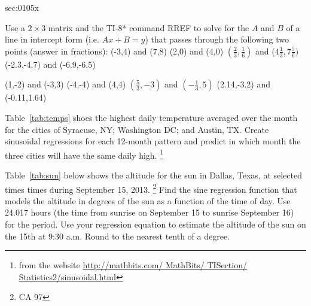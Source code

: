 \begin{multicols*}{2}
\begin{exercises}{sec:0105x}
\prob[0105LM1]
Use a $2 \times 3$ matrix and the TI-8* command RREF to solve for the
$A$ and $B$ of a line in intercept form (i.e. $Ax+B=y$) that passes
through the following two points (answer in fractions):
\subprob (-3,4) and (7,8)
\subprob (2,0) and (4,0)
\subprob $(\frac{2}{3},\frac{1}{6})$ and ($4\frac{1}{3},7\frac{5}{6})$
\subprob (-2.3,-4.7) and (-6.9,-6.5)

\prob[0105LM2]
\subprob (1,-2) and (-3,3)
\subprob (-4,-4) and (4,4)
\subprob $(\frac{5}{3},-3)$ and $(-\frac{1}{3},5)$
\subprob (2.14,-3.2) and (-0.11,1.64)


\prob[0105high] Table~\ref{tab:temps} shoes the highest daily temperature  averaged over the month for the cities of 
Syracuse, NY; Washington DC; and Austin, TX.  Create sinusoidal regressions for each 12-month 
pattern and predict in which month the three cities will have the same daily high. 
\footnote{from the website \url{http://mathbits.com/ MathBits/ TISection/ Statistics2/sinusoidal.html}}



\prob[0105sun] Table~\ref{tab:sun} below shows the altitude for the
sun in Dallas, Texas, at selected times times during September 15, 2013. \footnote{CA 97}
\subprob Find the sine regression function that models 
the altitude in degrees of the sun as a function of the
time of day.  Use 24.017 hours (the time from sunrise
on September 15 to sunrise September 16) for the period.
\subprob Use your regression equation to estimate the altitude
of the sun on the 15th at 9:30 a.m.  Round to the nearest
tenth of a degree.



\end{exercises}
\end{multicols*}
